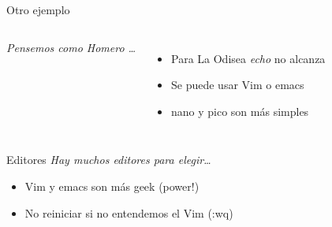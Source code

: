 \begin{frame}{ Otro ejemplo }
\begin{columns}[onlytextwidth]
	\textit{ Pensemos como Homero \ldots {} }
	\begin{itemize}
		\item Para La Odisea \textit{ echo } no alcanza
		\item Se puede usar Vim o emacs
		\item nano y pico son m\'as simples
	\end{itemize}
	 {
	} \only<2> {
	}
\end{columns}
\end{frame}



\begin{frame}{Editores}
\textit{Hay muchos editores para elegir\ldots}
\begin{itemize}
	\item Vim y emacs son m\'as geek (power!)
	\item No reiniciar si no entendemos el Vim (:wq)
\end{itemize}

\begin{center}
\end{center}
\end{frame}



